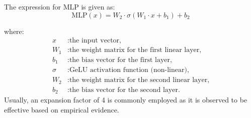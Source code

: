 The expression for MLP is given as:\\

\begin{equation}
    \text{MLP}(x) = W_2 \cdot \sigma(W_1 \cdot x + b_1) + b_2 \label{eq:mlp}
\end{equation}

where:
\begin{align*}
    x      & : \text{the input vector,}                              \\
    W_1    & : \text{the weight matrix for the first linear layer,}  \\
    b_1    & : \text{the bias vector for the first layer,}           \\
    \sigma & : \text{GeLU activation function (non-linear),}         \\
    W_2    & : \text{the weight matrix for the second linear layer,} \\
    b_2    & : \text{the bias vector for the second layer.}
\end{align*}
Usually, an expansion factor of 4 is commonly employed as it is observed to be effective based on empirical evidence.\\
\\


